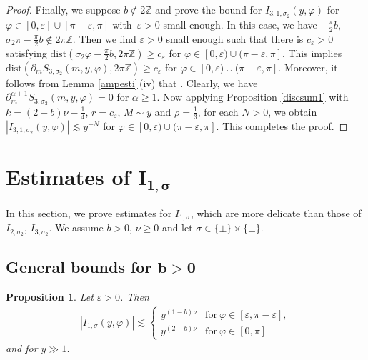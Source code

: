\documentclass[pdftex]{sigma}
\numberwithin{equation}{section}
\newtheorem{Proposition}[Theorem]{Proposition}
 { \theoremstyle{definition}
\newtheorem{Definition}[Theorem]{Definition}
\newtheorem{Note}[Theorem]{Note}
\newtheorem{Example}[Theorem]{Example}
\newtheorem{Remark}[Theorem]{Remark} }
\def\a{\alpha}
\def\e{\varepsilon}
\def\f{\varphi}
\def\n{\nu}
\def\s{\sigma}
\def\z{\zeta}
\def\pa{\partial}
\begin{document}
\begin{proof}
Finally, we suppose $b\notin 2\mathbb{Z}$ and prove the bound for $I_{3,1,\s_2}(y,\f)$ for $\f\in [0,\e]\cup [\pi-\e,\pi]$ with~${\e>0}$ small enough. In this case, we have
$
-\frac{\pi}{2}b$, $ \s_2\pi-\frac{\pi}{2}b\notin 2\pi \mathbb{Z}$.
Then we find $\e>0$ small enough such that there is $c_{\e}>0$ satisfying $\mathrm{dist}(\s_2\f-\frac{\pi}{2}b,2\pi\mathbb{Z})\geq c_{\e}$ for $\f\in [0,\e)\cup (\pi-\e,\pi]$. This implies $\mathrm{dist}(\pa_mS_{3,\s_2}(m,y,\f), 2\pi\mathbb{Z})\geq c_{\e}$ for $\f\in [0,\e)\cup (\pi-\e,\pi]$. Moreover, it follows from Lemma \ref{ampesti}\,(iv) that \smash{$|\pa_{m}^{\a}\z_{3,1,\s_2}(m,y,\f)|\lesssim y^{(2-b)\n-\frac{1}{4}-\frac{\a}{3}}$}. Clearly, we have $\pa_m^{\a+1}S_{3,\s_2}(m,y,\f)=0$ for $\a\geq 1$.
Now applying Proposition \ref{discsum1} with $k=(2-b)\n-\frac{1}{4}$, $r=c_{\e}$, $M\sim y$ and $\rho=\frac{1}{3}$, for each $N>0$, we obtain
$
|I_{3,1,\s_2}(y,\f)|\lesssim y^{-N}$ for $\f\in [0,\e)\cup (\pi-\e,\pi]$.
This completes the proof.
\end{proof}

\section[Estimates of I\_\{1,s\}]{Estimates of $\boldsymbol{ I_{1,\s}}$}


In this section, we prove estimates for $I_{1,\s}$, which are more delicate than those of $I_{2,\s_2}$, $I_{3,\s_2}$.
We assume $b>0$, $\n\geq 0$ and let $\s\in \{\pm\}\times \{\pm\}$.

\subsection[General bounds for b>0]{General bounds for $\boldsymbol{b>0}$}

\begin{Proposition}\label{I_1prop}
Let $\e>0$. Then
\begin{align*}
|I_{1,\s}(y,\f)|\lesssim \begin{cases}
y^{(1-b)\n}& \text{for}\  \f\in [\e,\pi-\e], \\
y^{(2-b)\n}& \text{for}\  \f\in [0,\pi]
\end{cases}
\end{align*}
and for $y\gg 1$.
\end{Proposition}
\end{document}
